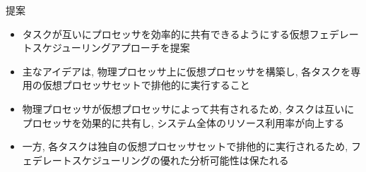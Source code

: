 
\begin{frame}{提案}
    \begin{itemize}
        \item タスクが互いにプロセッサを効率的に共有できるようにする仮想フェデレートスケジューリングアプローチを提案
        \item 主なアイデアは, 物理プロセッサ上に仮想プロセッサを構築し, 各タスクを専用の仮想プロセッサセットで排他的に実行すること
        \item 物理プロセッサが仮想プロセッサによって共有されるため, タスクは互いにプロセッサを効果的に共有し, システム全体のリソース利用率が向上する
        \item 一方, 各タスクは独自の仮想プロセッサセットで排他的に実行されるため, フェデレートスケジューリングの優れた分析可能性は保たれる
    \end{itemize}
\end{frame}
